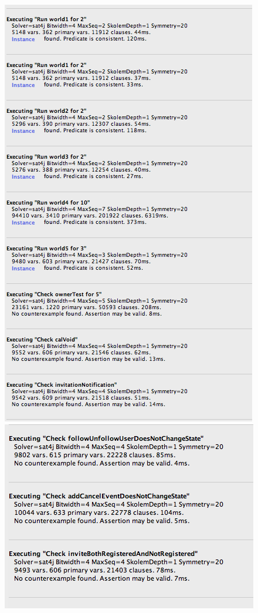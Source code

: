 \documentclass[12pt]{book}
\begin{document}
\includegraphics[scale=0.8]{result1}\\
\includegraphics[scale=0.8]{result2}\\
\end{document}
